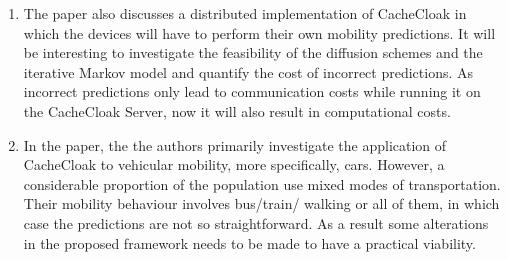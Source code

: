 \begin{enumerate}

	\item The paper also discusses a distributed implementation of CacheCloak in which the devices 
	will have to perform their own mobility predictions. It will be interesting to investigate the 
	feasibility of the diffusion schemes and the iterative Markov model and quantify the cost of 
	incorrect predictions. As incorrect predictions only lead to communication costs while running 
	it on the CacheCloak Server, now it will also result in computational costs. 
	
	\item In the paper, the the authors primarily investigate the application of CacheCloak to 
	vehicular mobility, more specifically, cars. However, a considerable proportion of the 
	population use mixed modes of transportation. Their mobility behaviour involves bus/train/
	walking	or all of them, in which case the predictions are not so straightforward. As a result 
	some alterations in the proposed framework needs to be made to have a practical viability. 
	
\end{enumerate}
